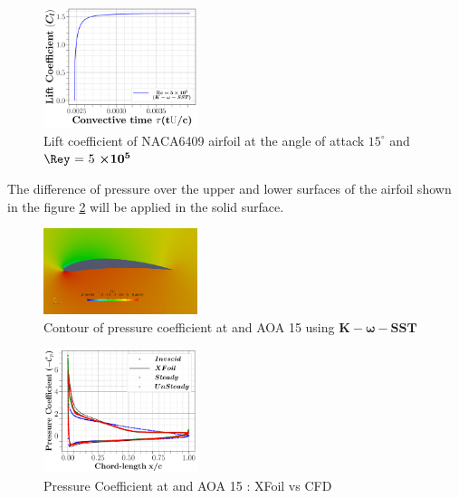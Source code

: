 \begin{figure}[ht!]
\centering
\includegraphics[width=0.4\textwidth]{figs/LiftCoeAngle15.pdf}
\caption{Lift coefficient of NACA6409 airfoil at the angle of attack $15^{\circ}$ and $\boldsymbol{\Rey$ = 5 $\times 10^5}$}
\label{fig:lfitCoe} 
\end{figure}











The difference of pressure over the upper and lower surfaces of the airfoil  shown in the figure \ref{fig:Cpcontour} will be applied in the solid surface.


\begin{figure}[ht!]
\centering
    \includegraphics[width=0.4\textwidth]{Figures/CpContour.png}
\caption{Contour of pressure coefficient at and AOA 15 using $\boldsymbol{K-\omega-SST}$}
\label{fig:Cpcontour} 
\end{figure}


\begin{figure}[ht!]
\centering
    \includegraphics[width=0.4\textwidth]{figs/CfdVsXfoil.pdf}
\caption{Pressure Coefficient at and AOA 15 : XFoil vs CFD}
\label{fig:Cp} 
\end{figure}




